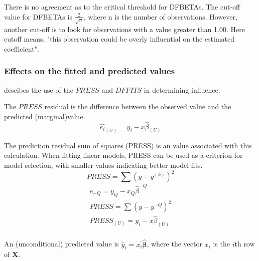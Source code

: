 \documentclass[12pt, a4paper]{report}
\theoremstyle{plain}
\theoremstyle{definition}
\theoremstyle{remark}
\begin{document}
	There is no agreement as to the critical threshold for DFBETAs. The cut-off value for DFBETAs is $\frac{2}{\sqrt{n}}$, where n is the number of observations.
	However, another cut-off is to look for observations with a value greater than 1.00. Here cutoff means,
	"this observation could be overly influential on the estimated coefficient".
	

	\subsubsection{Effects on the fitted and predicted values}
	\citet{schabenberger} descibes the use of the $PRESS$ and $DFFITS$ in determining influence.
	
	The $PRESS$ residual is the difference between the observed value and the predicted (marginal)value.
	\begin{equation}
	\hat{e_{i}}_{(U)} = y_{i} - x\hat{\beta}_{(U)}
	\end{equation}
	
	The prediction residual sum of squares (PRESS) is an value associated with this calculation. When fitting linear models, PRESS can be used as a criterion for model selection, with smaller values indicating better model fits.
	\begin{equation}
	PRESS = \sum(y-y^{(k)})^2
	\end{equation}
	\begin{eqnarray*}
		e_{-Q} = y_{Q} - x_{Q}\hat{\beta}^{-Q}\\
		PRESS = \sum(y-y^{-Q})^2\\
		PRESS_{(U)} = y_{i} - x\hat{\beta}_{(U)}\\
	\end{eqnarray*}
	
	
	An (unconditional) predicted value is $\hat{y}_i = x^{\prime}_i \boldsymbol{\hat{\beta}}$, where
	the vector $x_i$ is the $i$th row of $\boldsymbol{X}$.
	
	
\end{document}
